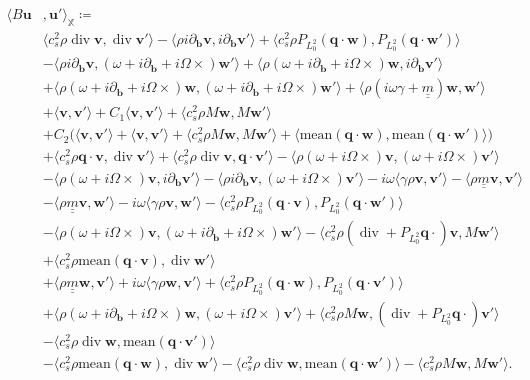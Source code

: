 \documentclass{m2an}
\newcommand{\csr}{c_s^2 \rho}
\newcommand{\bflow}{\mathbf{b}}
\renewcommand{\u}{\mathbf{u}}
\renewcommand{\v}{\mathbf{v}}
\newcommand{\w}{\mathbf{w}}
\newcommand{\q}{\mathbf{q}} %
\renewcommand{\div}{\operatorname{div}}
\newcommand{\X}{\mathbb{X}}
\newcommand{\spl}{\langle}
\newcommand{\spr}{\rangle}
\newcommand{\diffb}{\partial_{\bflow}}
\newcommand{\matii}{\underline{\underline{m}}}
\theoremstyle{plain}
\theoremstyle{definition}
\begin{document}
\begin{subequations}\label{eq:B}
   \begin{align}
      \spl B \u&, \u' \spr_{\X} \coloneqq \nonumber \\
      &\spl c_s^2 \rho \div \v, \div \v' \spr - \spl \rho i \diffb \v, i \diffb \v' \spr + \spl c_s^2 \rho P_{L^2_0}(\q \cdot \w), P_{L^2_0}(\q \cdot \w') \spr \\
      &- \spl \rho i \diffb \v, (\omega + i\diffb + i\Omega \times) \w' \spr + \spl \rho (\omega + i \diffb + i \Omega \times) \w, i \diffb \v' \spr \\
      &+ \spl \rho (\omega + i \diffb + i \Omega \times) \w, (\omega + i \diffb + i \Omega \times) \w' \spr + \spl \rho (i \omega \gamma + \matii) \w, \w' \spr \\
      &+ \spl \v, \v' \spr + C_1 \spl \v, \v' \spr + \spl \csr M \w, M\w' \spr \\[.5cm]
      &+ C_2 \Big(  \spl \v, \v' \spr + \spl \v, \v' \spr + \spl \csr M \w, M \w' \spr + \spl \text{mean}(\q \cdot \w), \text{mean}(\q \cdot \w') \spr \Big)\\[.5cm]
      &+ \spl c_s^2 \rho \q \cdot \v, \div \v' \spr + \spl c_s^2 \rho \div \v, \q \cdot \v' \spr - \spl \rho (\omega + i \Omega \times) \v, (\omega + i \Omega \times) \v' \spr \\ 
      &- \spl \rho (\omega + i\Omega \times) \v, i \diffb \v' \spr - \spl \rho i \diffb \v, (\omega + i \Omega \times) \v' \spr - i \omega \spl \gamma \rho \v, \v' \spr - \spl \rho \matii \v, \v' \spr \\[.5cm] 
      &- \spl \rho \matii \v, \w' \spr - i \omega \spl \gamma \rho \v, \w' \spr - \spl c_s^2 \rho P_{L^2_0} (\q \cdot \v), P_{L^2_0} (\q \cdot \w') \spr \\
      &- \spl \rho (\omega + i \Omega \times) \v, (\omega + i \diffb + i \Omega \times) \w' \spr - \spl c_s^2 \rho (\div + P_{L^2_0} \q \cdot) \v, M \w' \spr \\ 
      &+ \spl c_s^2 \rho \text{mean}(\q \cdot \v), \div \w' \spr \\[.5cm]
      &+ \spl  \rho \matii \w, \v' \spr + i \omega \spl \gamma \rho \w, \v' \spr + \spl c_s^2 \rho P_{L^2_0} (\q \cdot \w), P_{L^2_0} (\q \cdot \v') \spr \\
      &+ \spl \rho (\omega + i \diffb + i \Omega \times) \w, (\omega + i \Omega \times) \v' \spr + \spl c_s^2 \rho M \w, (\div + P_{L^2_0} \q \cdot) \v' \spr \\
      &- \spl c_s^2 \rho \div \w, \text{mean}(\q \cdot \v') \spr \\[.5cm]
      &- \spl c_s^2 \rho \text{mean}(\q \cdot \w), \div \w' \spr - \spl c_s^2 \rho \div \w, \text{mean}(\q \cdot \w') \spr - \spl c_s^2 \rho M \w, M \w' \spr.
   \end{align}
\end{subequations}
\end{document}
